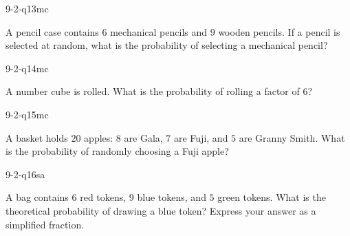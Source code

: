 \begin{practiceQuestion}{9-2-q13}{mc}
\begin{questionText}
A pencil case contains $6$ mechanical pencils and $9$ wooden pencils. If a pencil is selected at random, what is the probability of selecting a mechanical pencil?
\end{questionText}
\end{practiceQuestion}

\begin{practiceQuestion}{9-2-q14}{mc}
\begin{questionText}
A number cube is rolled. What is the probability of rolling a factor of $6$?
\end{questionText}
\end{practiceQuestion}

\begin{practiceQuestion}{9-2-q15}{mc}
\begin{questionText}
A basket holds $20$ apples: $8$ are Gala, $7$ are Fuji, and $5$ are Granny Smith. What is the probability of randomly choosing a Fuji apple?
\end{questionText}
\end{practiceQuestion}


\begin{practiceQuestion}{9-2-q16}{sa}
\begin{questionText}
A bag contains $6$ red tokens, $9$ blue tokens, and $5$ green tokens. What is the theoretical probability of drawing a blue token? Express your answer as a simplified fraction.
\end{questionText}
\end{practiceQuestion}

